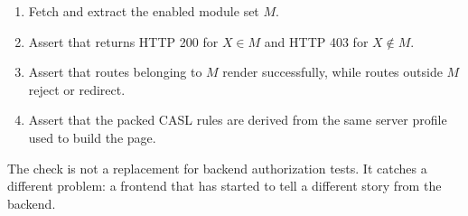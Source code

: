 \begin{enumerate}
  \item Fetch  and extract the enabled module set $M$.
  \item Assert that  returns HTTP 200 for $X \in M$ and HTTP 403 for $X \notin M$.
  \item Assert that routes belonging to $M$ render successfully, while routes outside $M$ reject or redirect.
  \item Assert that the packed CASL rules are derived from the same server profile used to build the page.
\end{enumerate}

The check is not a replacement for backend authorization tests. It catches a different problem: a frontend that has started to tell a different story from the backend.
